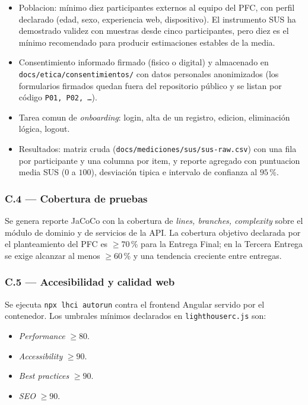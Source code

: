 \documentclass[11pt,a4paper]{article}
\begin{document}
\begin{itemize}
    \item Poblacion: m\'{i}nimo diez participantes externos al equipo del PFC, con perfil declarado (edad, sexo, experiencia web, dispositivo). El instrumento SUS ha demostrado validez con muestras desde cinco participantes, pero diez es el m\'{i}nimo recomendado para producir estimaciones estables de la media.
    \item Consentimiento informado firmado (fisico o digital) y almacenado en \texttt{docs/etica/consentimientos/} con datos personales anonimizados (los formularios firmados quedan fuera del repositorio p\'{u}blico y se listan por c\'{o}digo \texttt{P01, P02, \ldots}).
    \item Tarea comun de \emph{onboarding}: login, alta de un registro, edicion, eliminaci\'{o}n l\'{o}gica, logout.
    \item Resultados: matriz cruda (\texttt{docs/mediciones/sus/sus-raw.csv}) con una fila por participante y una columna por item, y reporte agregado con puntuacion media SUS ($0$ a $100$), desviaci\'{o}n tipica e intervalo de confianza al $95$\,\%.
\end{itemize}

\subsubsection*{C.4 --- Cobertura de pruebas}

Se genera reporte JaCoCo con la cobertura de \emph{lines, branches, complexity} sobre el m\'{o}dulo de dominio y de servicios de la API. La cobertura objetivo declarada por el planteamiento del PFC es $\geq 70$\,\% para la Entrega Final; en la Tercera Entrega se exige alcanzar al menos $\geq 60$\,\% y una tendencia creciente entre entregas.

\subsubsection*{C.5 --- Accesibilidad y calidad web}

Se ejecuta \texttt{npx lhci autorun} contra el frontend Angular servido por el contenedor. Los umbrales m\'{i}nimos declarados en \texttt{lighthouserc.js} son:

\begin{itemize}
    \item \emph{Performance} $\geq 80$.
    \item \emph{Accessibility} $\geq 90$.
    \item \emph{Best practices} $\geq 90$.
    \item \emph{SEO} $\geq 90$.
\end{itemize}
\end{document}
